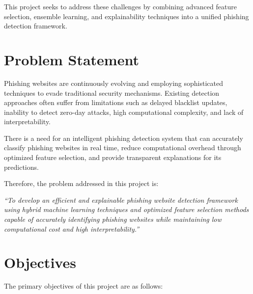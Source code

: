 \documentclass[12pt]{report}
\begin{document}
This project seeks to address these challenges by combining advanced feature selection, ensemble learning, and explainability techniques into a unified phishing detection framework.

\section{Problem Statement}

Phishing websites are continuously evolving and employing sophisticated techniques to evade traditional security mechanisms. Existing detection approaches often suffer from limitations such as delayed blacklist updates, inability to detect zero-day attacks, high computational complexity, and lack of interpretability.

There is a need for an intelligent phishing detection system that can accurately classify phishing websites in real time, reduce computational overhead through optimized feature selection, and provide transparent explanations for its predictions.

Therefore, the problem addressed in this project is:

\textit{``To develop an efficient and explainable phishing website detection framework using hybrid machine learning techniques and optimized feature selection methods capable of accurately identifying phishing websites while maintaining low computational cost and high interpretability.''}

\section{Objectives}

The primary objectives of this project are as follows:
\end{document}
